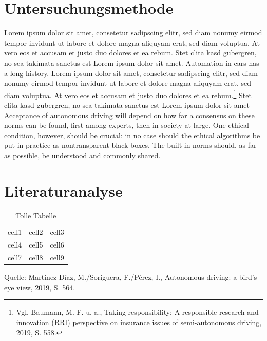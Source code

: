 \section{Untersuchungsmethode}

Lorem ipsum dolor sit amet, consetetur sadipscing elitr, sed diam nonumy eirmod tempor invidunt ut labore et dolore magna aliquyam erat, sed diam voluptua. 
At vero eos et accusam et justo duo dolores et ea rebum. 
Stet clita kasd gubergren, no sea takimata sanctus est Lorem ipsum dolor sit amet. 
Automation in cars has a long history.  Lorem ipsum dolor sit amet, consetetur sadipscing elitr, sed diam nonumy eirmod tempor invidunt ut labore et dolore magna aliquyam erat, sed diam voluptua. 
At vero eos et accusam et justo duo dolores et ea rebum.\footnote{Vgl. Baumann, M. F. u. a., Taking responsibility: A responsible research and innovation (RRI) perspective on insurance issues of semi-autonomous driving, 2019, S. 558.} 
Stet clita kasd gubergren, no sea takimata sanctus est Lorem ipsum dolor sit amet Acceptance of autonomous driving will depend on how far a consensus on these norms can be found, first among experts, then in society at large. 
One ethical condition, however, should be crucial: in no case should the ethical algorithms be put in practice as nontransparent black boxes. 
The built-in norms should, as far as possible, be understood and commonly shared.


\section{Literaturanalyse}

\begin{table}[h]
	\caption{Tolle Tabelle}
	\centering
	\begin{tabular}{ | c | c | c | } 
		\hline
		cell1 & cell2 & cell3 \\ 
		cell4 & cell5 & cell6 \\ 
		cell7 & cell8 & cell9 \\ 
		\hline
	\end{tabular}
	\begin{flushleft}
		Quelle: Martínez-Díaz, M./Soriguera, F./Pérez, I., Autonomous driving: a bird's eye view, 2019, S. 564.	
	\end{flushleft}	
\end{table}

